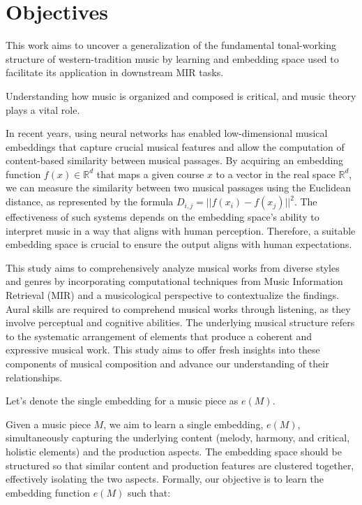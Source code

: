\section{Objectives}

This work aims to uncover a generalization of the fundamental tonal-working structure of western-tradition music by learning and embedding space used to facilitate its application in downstream MIR tasks. 

Understanding how music is organized and composed is critical, and music theory plays a vital role.

In recent years, using neural networks has enabled low-dimensional musical embeddings that capture crucial musical features and allow the computation of content-based similarity between musical passages. By acquiring an embedding function $f(x) \in \mathbb{R}^d$ that maps a given course $x$ to a vector in the real space $\mathbb{R}^d$, we can measure the similarity between two musical passages using the Euclidean distance, as represented by the formula $D_{i,j} = ||f(x_i) - f(x_j)||^2$. The effectiveness of such systems depends on the embedding space's ability to interpret music in a way that aligns with human perception. Therefore, a suitable embedding space is crucial to ensure the output aligns with human expectations.

This study aims to comprehensively analyze musical works from diverse styles and genres by incorporating computational techniques from Music Information Retrieval (MIR) and a musicological perspective to contextualize the findings. Aural skills are required to comprehend musical works through listening, as they involve perceptual and cognitive abilities. The underlying musical structure refers to the systematic arrangement of elements that produce a coherent and expressive musical work. This study aims to offer fresh insights into these components of musical composition and advance our understanding of their relationships.

Let's denote the single embedding for a music piece as $e(M)$.

Given a music piece $M$, we aim to learn a single embedding, $e(M)$, simultaneously capturing the underlying content (melody, harmony, and critical, holistic elements) and the production aspects. The embedding space should be structured so that similar content and production features are clustered together, effectively isolating the two aspects. Formally, our objective is to learn the embedding function $e(M)$ such that:

